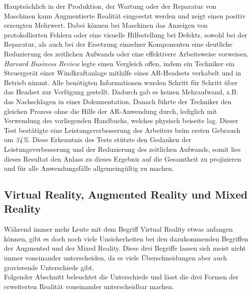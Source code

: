 Hauptsächlich in der Produktion, der Wartung oder der Reparatur von Maschinen kann Augmentierte Realität eingesetzt werden und zeigt einen 
positiv erzeugten Mehrwert. Dabei können bei Maschinen das Anzeigen von protokollierten Fehlern oder eine visuelle Hilfestellung bei Defekts, sowohl bei der 
Reparatur, als auch bei der Ersetzung einzelner Komponenten eine deutliche Reduzierung des zeitlichen Aufwands oder eine effektivere Arbeitsweise 
vorweisen. 
\\
\textit{Harvard Business Review} legte einen Vergleich offen, indem ein Techniker ein Steuergerät einer Windkraftanlage mithilfe 
eines \acs{AR}-Headsets verkabelt und in Betrieb nimmt. Alle benötigten Informationen wurden Schritt für Schritt über das Headset zur Verfügung 
gestellt. Dadurch gab es keinen Mehraufwand, z.B. das Nachschlagen in einer Dokumentation. Danach führte der Techniker den gleichen Prozess 
ohne die Hilfe der AR-Anwendung durch, lediglich mit Verwendung des vorliegenden Handbuchs, welches physisch beiseite lag.
Dieser Test bestätigte eine Leistungsverbesserung des Arbeiters beim ersten Gebrauch um \textit{34\%}.\cite{harvardbr.2017m} Diese Erkenntnis 
des Tests stützte den Gedanken der Leistungsverbesserung und der Reduzierung des zeitlichen Aufwands, somit lies dieses Resultat den 
Anlass zu dieses Ergebnis auf die Gesamtheit zu projizieren und für alle Anwendungsfälle allgemeingültig zu machen. 


\subsection{Virtual Reality, Augmented Reality und Mixed Reality}
Während immer mehr Leute mit dem Begriff Virtual Reality etwas anfangen können, gibt es doch noch viele Unsicherheiten bei den dazukommenden 
Begriffen der Augmented und der Mixed Reality. Diese drei Begriffe lassen sich meist nicht immer voneinander unterscheiden, da es viele 
Überschneidungen aber auch gravierende Unterschiede gibt. 
\\ 
Folgender Abschnitt beleuchtet die Unterschiede und lässt die drei Formen der erweiterten Realität voneinander unterscheidbar machen.
